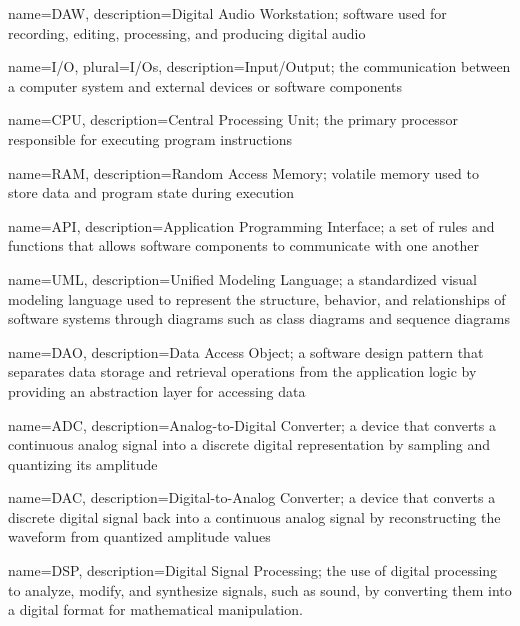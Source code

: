 

{
    name={DAW},
    description={Digital Audio Workstation; software used for recording, editing, processing, and producing digital audio}
}

{
    name={I/O},
    plural={I/Os},
    description={Input/Output; the communication between a computer 
    system and external devices or software components}
}

{
    name={CPU},
    description={Central Processing Unit; the primary processor responsible for executing program instructions}
}

{
    name={RAM},
    description={Random Access Memory; volatile memory used to store data and program state during execution}
}

{
    name={API},
    description={Application Programming Interface; a set of rules and functions that allows software components to communicate with one another}
}

{
    name={UML},
    description={Unified Modeling Language; a standardized visual modeling language used to represent the 
    structure, behavior, and relationships of software systems through diagrams such as class diagrams 
    and sequence diagrams}
}

{
    name={DAO},
    description={Data Access Object; a software design pattern that separates data storage and 
    retrieval operations from the application logic by providing an abstraction layer for 
    accessing data}
}

{
    name={ADC},
    description={Analog-to-Digital Converter; a device that converts a continuous analog
    signal into a discrete digital representation by sampling and
    quantizing its amplitude}
}

{
    name={DAC},
    description={Digital-to-Analog Converter; a device that converts a discrete digital
    signal back into a continuous analog signal by reconstructing the
    waveform from quantized amplitude values}
}

{
    name={DSP},
    description={Digital Signal Processing; the use of digital processing to analyze, modify, and 
    synthesize signals, such as sound, by converting them into a digital format for 
    mathematical manipulation.}
}


